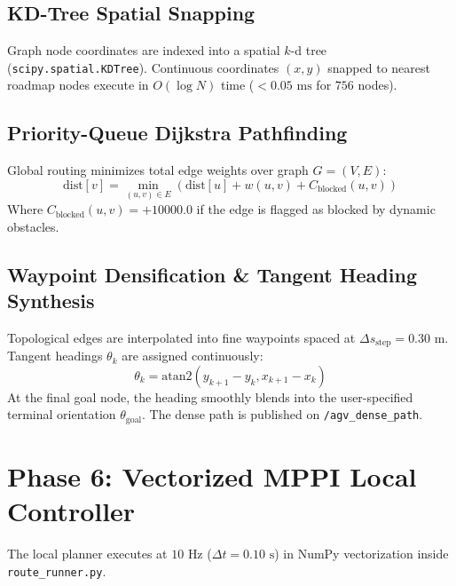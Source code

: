 \documentclass[10pt,a4paper]{article}
\begin{document}
\subsection{KD-Tree Spatial Snapping}
Graph node coordinates are indexed into a spatial $k$-d tree (\texttt{scipy.spatial.KDTree}). Continuous coordinates $(x, y)$ snapped to nearest roadmap nodes execute in $O(\log N)$ time ($< 0.05\text{ ms}$ for $756$ nodes).

\subsection{Priority-Queue Dijkstra Pathfinding}
Global routing minimizes total edge weights over graph $G = (V, E)$:
\begin{equation}
\text{dist}[v] = \min_{(u, v) \in E} \left(\text{dist}[u] + w(u, v) + C_{\text{blocked}}(u, v)\right)
\end{equation}
Where $C_{\text{blocked}}(u, v) = +10000.0$ if the edge is flagged as blocked by dynamic obstacles.

\subsection{Waypoint Densification \& Tangent Heading Synthesis}
Topological edges are interpolated into fine waypoints spaced at $\Delta s_{\text{step}} = 0.30\text{ m}$. Tangent headings $\theta_k$ are assigned continuously:
\begin{equation}
\theta_k = \text{atan2}(y_{k+1} - y_k, x_{k+1} - x_k)
\end{equation}
At the final goal node, the heading smoothly blends into the user-specified terminal orientation $\theta_{\text{goal}}$. The dense path is published on \texttt{/agv\_dense\_path}.

\section{Phase 6: Vectorized MPPI Local Controller}

The local planner executes at $10\text{ Hz}$ ($\Delta t = 0.10\text{ s}$) in NumPy vectorization inside \texttt{route\_runner.py}.
\end{document}
